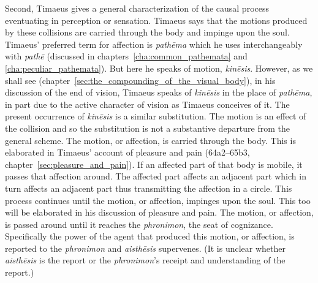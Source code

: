 Second, Timaeus gives a general characterization of the causal process eventuating in perception or sensation. Timaeus says that the motions produced by these collisions are carried through the body and impinge upon the soul. Timaeus' preferred term for affection is \emph{pathēma} which he uses interchangeably with \emph{pathē} (discussed in chapters~\ref{cha:common_pathemata} and \ref{cha:peculiar_pathemata}). But here he speaks of motion, \emph{kinēsis}. However, as we shall see (chapter~\ref{sec:the_compounding_of_the_visual_body}), in his discussion of the end of vision, Timaeus speaks of \emph{kinēsis} in the place of \emph{pathēma}, in part due to the active character of vision as Timaeus conceives of it. The present occurrence of \emph{kinēsis} is a similar substitution. The motion is an effect of the collision and so the substitution is not a substantive departure from the general scheme. The motion, or affection, is carried through the body. This is elaborated in Timaeus' account of pleasure and pain (64a2–65b3, chapter~\ref{sec:pleasure_and_pain}). If an affected part of that body is mobile, it passes that affection around. The affected part affects an adjacent part which in turn affects an adjacent part thus transmitting the affection in a circle. This process continues until the motion, or affection, impinges upon the soul. This too will be elaborated in his discussion of pleasure and pain. The motion, or affection, is passed around until it reaches the \emph{phronimon}, the seat of cognizance. Specifically the power of the agent that produced this motion, or affection, is reported to the \emph{phronimon} and \emph{aisthēsis} supervenes. (It is unclear whether \emph{aisthēsis} is the report or the \emph{phronimon}'s receipt and understanding of the report.)

